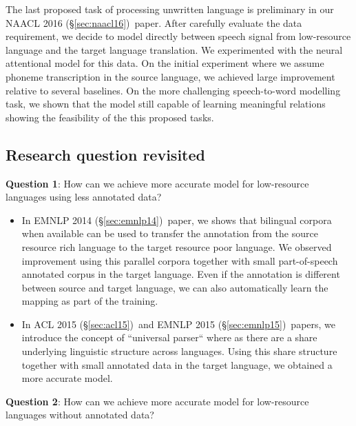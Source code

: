 \documentclass[12pt,twoside,final,hidelinks]{ltthesis}
\theoremstyle{definition}
\newcommand\emnlpiv{EMNLP 2014 (\S\ref{sec:emnlp14})}
\newcommand\aclv{ACL 2015 (\S\ref{sec:acl15})}
\newcommand\emnlpv{EMNLP 2015 (\S\ref{sec:emnlp15})}
\newcommand\naaclvi{NAACL 2016 (\S\ref{sec:naacl16})}
\begin{document}
The last proposed task of processing unwritten language is preliminary in our \naaclvi\ paper. After carefully evaluate the data requirement, we decide 
to model directly between speech signal from low-resource language and the target language translation. We experimented with the neural attentional model 
for this data. On the initial experiment where we assume phoneme transcription in the source language, we achieved large improvement relative to several 
baselines. On the more challenging speech-to-word modelling task, we shown that the model still capable of learning meaningful relations showing the feasibility 
of the this proposed tasks. 

\subsection{Research question revisited}
\textbf{Question 1}: How can we achieve more accurate model for low-resource languages using less annotated data? 
\begin{itemize}
\item In \emnlpiv\ paper, we shows that bilingual corpora when available can be used to transfer the annotation from the source resource rich language to the target 
resource poor language. We observed improvement using this parallel corpora together with small part-of-speech annotated corpus in the target language. Even if 
the annotation is different between source and target language, we can also automatically learn the mapping as part of the training. 
\item 	In \aclv\ and \emnlpv\ papers, we introduce the concept of ``universal parser`` where as there are a share underlying linguistic structure across languages. 
Using this share structure together with small annotated data in the target language, we obtained a more accurate model.  
\end{itemize}

\textbf{Question 2}: How can we achieve more accurate model for low-resource languages without annotated data?
\end{document}
